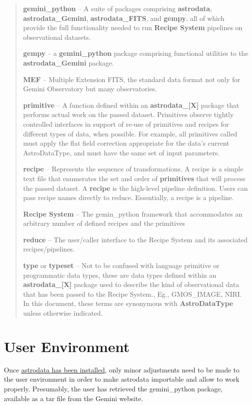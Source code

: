 \documentclass[letterpaper,10pt,english]{sphinxmanual}
\begin{document}
\begin{quote}
\textbf{gemini\_python} -- A suite of packages comprising \textbf{astrodata},
\textbf{astrodata\_Gemini}, \textbf{astrodata\_FITS}, and \textbf{gempy}, all of which provide
the full functionality needed to run \textbf{Recipe System}  pipelines on
observational datasets.

\textbf{gempy} -- a \textbf{gemini\_python} package comprising functional utilities to
the \textbf{astrodata\_Gemini} package.

\textbf{MEF} -- Multiple Extension FITS, the standard data format not only for
Gemini Observatory but many observatories.

\textbf{primitive} -- A function defined within an \textbf{astrodata\_{[}X{]}} package that
performs actual work on the passed dataset. Primitives observe tightly
controlled interfaces in support of re-use of primitives and recipes for
different types of data, when possible. For example, all primitives called
 must apply the flat field correction appropriate for the data’s
current AstroDataType, and must have the same set of input parameters.

\textbf{recipe} -- Represents the sequence of transformations. A recipe is a
simple text file that enumerates the set and order of \textbf{primitives} that will
process the passed dataset. A \textbf{recipe} is the high-level pipeline definition.
Users can pass recipe names directly to reduce. Essentially, a recipe is a
pipeline.

\textbf{Recipe System} -- The gemin\_python framework that accommodates an arbitrary
number of defined recipes and the primitives

\textbf{reduce} -- The user/caller interface to the Recipe System and its associated
recipes/pipelines.

\textbf{type} or \textbf{typeset} --  Not to be confused with language primitive or
programmatic data types, these are data types defined within an
\textbf{astrodata\_{[}X{]}} package used to describe the kind of observational data that
has been passed to the Recipe System., Eg., GMOS\_IMAGE, NIRI. In this document,
these terms are synonymous with \textbf{AstroDataType} unless otherwise indicated.
\end{quote}


\chapter{User Environment}
\label{userenv::doc}\label{userenv:user-environment}
Once \href{http://gdpsg.wikis-internal.gemini.edu/index.php/InstallAstroData}{astrodata has been installed},
only minor adjustments need to be made to the user environment in order to make
astrodata importable and allow  to work properly. Presumably, the user
has retrieved the gemini\_python package, available as a tar file from the Gemini website.
\end{document}
